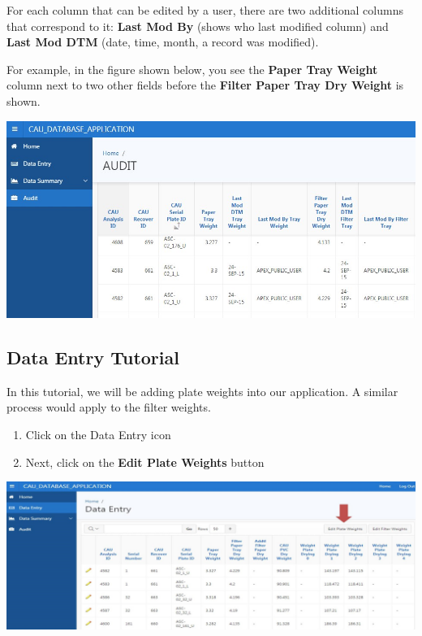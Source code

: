 \documentclass[]{book}
\begin{document}
For each column that can be edited by a user, there are two additional columns that correspond to it: \textbf{Last Mod By} (shows who last modified column) and \textbf{Last Mod DTM} (date, time, month, a record was modified).

For example, in the figure shown below, you see the \textbf{Paper Tray Weight} column next to two other fields before the \textbf{Filter Paper Tray Dry Weight} is shown.

\includegraphics{images/Data10.jpg}

\hypertarget{data-entry-tutorial}{%
\subsection{Data Entry Tutorial}\label{data-entry-tutorial}}

In this tutorial, we will be adding plate weights into our application. A similar process would apply to the filter weights.

\begin{enumerate}
\def\labelenumi{\arabic{enumi}.}
\item
  Click on the Data Entry icon
\item
  Next, click on the \textbf{Edit Plate Weights} button
\end{enumerate}

\includegraphics{images/Data11.jpg}
\end{document}
